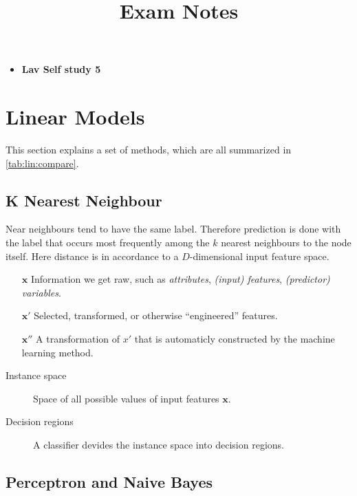 \title{Exam Notes}
\tableofcontents

\begin{itemize}
    \item \textbf{Lav Self study 5}
\end{itemize}

\section{Linear Models}

This section explains a set of methods, which are all summarized in \cref{tab:lin:compare}.

\subsection{K Nearest Neighbour}

Near neighbours tend to have the same label.
Therefore prediction is done with the label that occurs most frequently among the $k$ nearest neighbours to the node itself.
Here distance is in accordance to a $D$-dimensional input feature space.

\begin{mdframed}[frametitle={A Note on Features}]
    \begin{itemize}
        \item[$\mathbf{x}$] Information we get raw, such as \emph{attributes}, \emph{(input) features}, \emph{(predictor) variables}.
        \item[$\mathbf{x'}$] Selected, transformed, or otherwise ``engineered'' features.
        \item[$\mathbf{x''}$] A transformation of $x'$ that is automaticly constructed by the machine learning method.
    \end{itemize}
\end{mdframed}

\begin{description}
    \item[Instance space] Space of all possible values of input features $\mathbf{x}$.
    \item[Decision regions] A classifier devides the instance space into decision regions.
\end{description}

\subsection{Perceptron and Naive Bayes}

